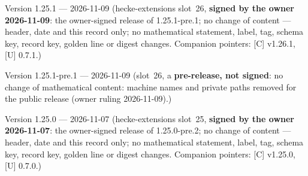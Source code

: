\documentclass[11pt]{article}
\theoremstyle{remark}
\begin{document}
Version 1.25.1 --- 2026-11-09 (hecke-extensions slot~26, \textbf{signed by the owner 2026-11-09}: the owner-signed release of 1.25.1-pre.1; no change of content --- header, date and this record only; no mathematical statement, label, tag, schema key, record key, golden line or digest changes. Companion pointers: [C] v1.26.1, [U] 0.7.1.)

Version 1.25.1-pre.1 --- 2026-11-09 (slot~26, a \textbf{pre-release, not signed}: no change of mathematical content: machine names and private paths removed for the public release (owner ruling 2026-11-09).)

Version 1.25.0 --- 2026-11-07 (hecke-extensions slot~25, \textbf{signed by the owner 2026-11-07}: the owner-signed release of 1.25.0-pre.2; no change of content --- header, date and this record only; no mathematical statement, label, tag, schema key, record key, golden line or digest changes. Companion pointers: [C] v1.25.0, [U] 0.7.0.)
\end{document}
